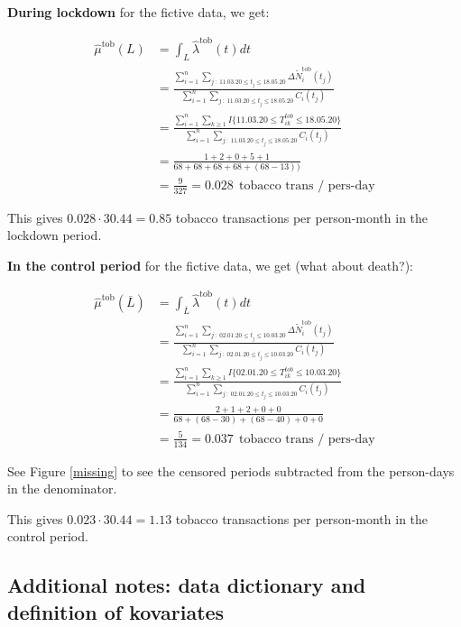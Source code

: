 \documentclass[
  11pt,
]{article}
\begin{document}
\textbf{During lockdown} for the fictive data, we get:

\begin{align*}
\hat{\mu}^{\text{tob}}(L) &= \int_L \hat{\lambda}^{\text{tob}} (t) dt \\
&=\frac{\sum_{i=1}^n \sum_{j \ : \ 11.03.20 \leq t_j \leq 18.05.20} \Delta \tilde{N}_i^{\text{tob}}(t_j)}{\sum_{i=1}^n \sum_{j \ : \  11.03.20 \leq t_j \leq 18.05.20} C_i(t_j)} \\
&=\frac{\sum_{i=1}^n \sum_{k \geq 1} I \{11.03.20 \leq T^{tob}_{ik} \leq 18.05.20\}}{\sum_{i=1}^n \sum_{j \ : \ 11.03.20 \leq t_j \leq 18.05.20} C_i(t_j)} \\
&=\frac{1+2+0+5+1}{68+68+68+68+(68-13))} \\
&=\frac{9}{327} = 0.028 \ \ \text{tobacco trans / pers-day}
\end{align*}

This gives \(0.028 \cdot 30.44 = 0.85\) tobacco transactions per
person-month in the lockdown period.

\textbf{In the control period} for the fictive data, we get (what about
death?):

\begin{align*}
\hat{\mu}^{\text{tob}}(\overline{L}) &= \int_{\overline{L}} \hat{\lambda}^{\text{tob}} (t) dt \\
&=\frac{\sum_{i=1}^n \sum_{j \ : \ 02.01.20 \leq t_j \leq 10.03.20} \Delta \tilde{N}_i^{\text{tob}}(t_j)}{\sum_{i=1}^n \sum_{j \ : \  02.01.20 \leq t_j \leq 10.03.20} C_i(t_j)} \\
&=\frac{\sum_{i=1}^n \sum_{k \geq 1} I \{02.01.20 \leq T^{tob}_{ik} \leq 10.03.20\}}{\sum_{i=1}^n \sum_{j \ : \ 02.01.20 \leq t_j \leq 10.03.20} C_i(t_j)} \\
&=\frac{2+1+2+0+0}{68+(68-30)+(68-40)+0+0} \\
&=\frac{5}{134}=0.037 \ \ \text{tobacco trans / pers-day}
\end{align*}

See Figure \ref{missing} to see the censored periods subtracted from the
person-days in the denominator.

This gives \(0.023 \cdot 30.44 = 1.13\) tobacco transactions per
person-month in the control period.

\newpage

\hypertarget{additional-notes-data-dictionary-and-definition-of-kovariates}{%
\subsection{Additional notes: data dictionary and definition of
kovariates}\label{additional-notes-data-dictionary-and-definition-of-kovariates}}
\end{document}
